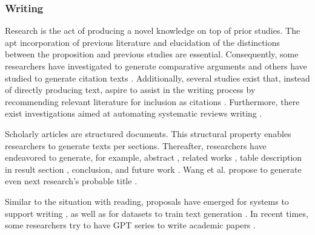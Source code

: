 \documentclass{article}
\begin{document}
\subsubsection{Writing}
Research is the act of producing a novel knowledge on top of prior studies. The apt incorporation of previous literature and elucidation of the distinctions between the proposition and previous studies are essential. Consequently, some researchers have investigated to generate comparative arguments \cite{yu2022scientific} and others have studied to generate citation texts \cite{arita2022citation,gu2022controllable,wang2021autocite,xing2020automatic,funkquist2022citebench}. Additionally, several studies exist that, instead of directly producing text, aspire to assist in the writing process by recommending relevant literature for inclusion as citations \cite{farber2020citation,zhang2020dual,duma2019contextual,farber2018cite,gosangi2021use}. Furthermore, there exist investigations aimed at automating systematic reviews writing \cite{dones2022systematic}.

Scholarly articles are structured documents. This structural property enables researchers to generate texts per sections. Thereafter, 
researchers have endeavored to generate, for example, abstract \cite{kumarasinghe2022automatic,gao2022comparing,wang2019paperrobot}, related works \cite{li2022automatic,shah2021generating}, table description in result section \cite{moosavi2021scigen,moosavi2021learning}, conclusion, and future work \cite{wang2019paperrobot}. Wang et al. propose to generate even next research's probable title \cite{wang2019paperrobot}.

Similar to the situation with reading, proposals have emerged for systems to support writing \cite{narimatsu2021task}, as well as for datasets to train text generation \cite{chen2021scixgen}. In recent times, some researchers try to have GPT series to write academic papers \cite{transformer2022can}. 



\end{document}
